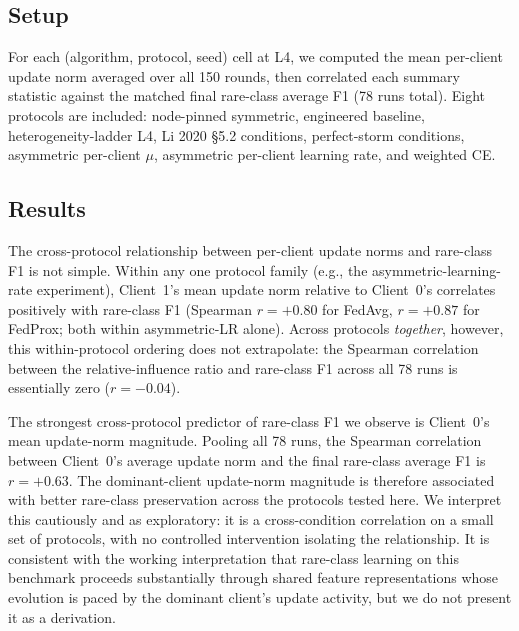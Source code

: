 \documentclass[11pt,a4paper]{report}
\begin{document}
\subsection{Setup}
For each (algorithm, protocol, seed) cell at L4, we computed the mean
per-client update norm averaged over all 150 rounds, then correlated
each summary statistic against the matched final rare-class average F1
(78 runs total). Eight protocols are included: node-pinned symmetric,
engineered baseline, heterogeneity-ladder L4, Li 2020 §5.2 conditions,
perfect-storm conditions, asymmetric per-client $\mu$, asymmetric
per-client learning rate, and weighted CE.

\subsection{Results}
The cross-protocol relationship between per-client update norms and
rare-class F1 is not simple. Within any one protocol family (e.g.,
the asymmetric-learning-rate experiment), Client~1's mean update
norm relative to Client~0's correlates positively with rare-class F1
(Spearman $r = +0.80$ for FedAvg, $r = +0.87$ for FedProx; both
within asymmetric-LR alone). Across protocols \emph{together},
however, this within-protocol ordering does not extrapolate: the
Spearman correlation between the relative-influence ratio and
rare-class F1 across all 78 runs is essentially zero ($r = -0.04$).

The strongest cross-protocol predictor of rare-class F1 we observe is
Client~0's mean update-norm magnitude. Pooling all 78 runs, the
Spearman correlation between Client~0's average update norm and the
final rare-class average F1 is $r = +0.63$. The dominant-client
update-norm magnitude is therefore associated with better rare-class
preservation across the protocols tested here. We interpret this
cautiously and as exploratory: it is a cross-condition correlation on
a small set of protocols, with no controlled intervention isolating
the relationship. It is consistent with the working interpretation
that rare-class learning on this benchmark proceeds substantially
through shared feature representations whose evolution is paced by
the dominant client's update activity, but we do not present it as a
derivation.

\end{document}
